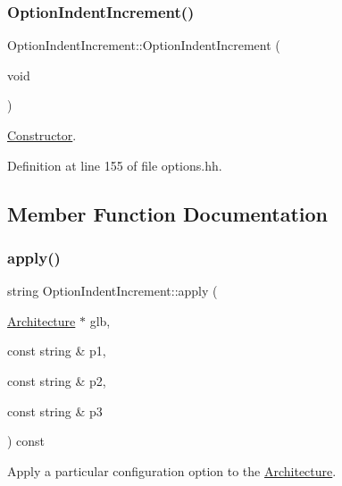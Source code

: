 \subsubsection{\texorpdfstring{OptionIndentIncrement()}{OptionIndentIncrement()}}
{\footnotesize\ttfamily Option\+Indent\+Increment\+::\+Option\+Indent\+Increment (\begin{DoxyParamCaption}\item[{void}]{ }\end{DoxyParamCaption})\hspace{0.3cm}{\ttfamily [inline]}}



\mbox{\hyperlink{class_constructor}{Constructor}}. 



Definition at line 155 of file options.\+hh.



\subsection{Member Function Documentation}
\mbox{\label{class_option_indent_increment_a2f5a66d0ce8ae8863e3498449011d360}} 
\subsubsection{\texorpdfstring{apply()}{apply()}}
{\footnotesize\ttfamily string Option\+Indent\+Increment\+::apply (\begin{DoxyParamCaption}\item[{\mbox{\hyperlink{class_architecture}{Architecture}} $\ast$}]{glb,  }\item[{const string \&}]{p1,  }\item[{const string \&}]{p2,  }\item[{const string \&}]{p3 }\end{DoxyParamCaption}) const\hspace{0.3cm}{\ttfamily [virtual]}}



Apply a particular configuration option to the \mbox{\hyperlink{class_architecture}{Architecture}}. 


